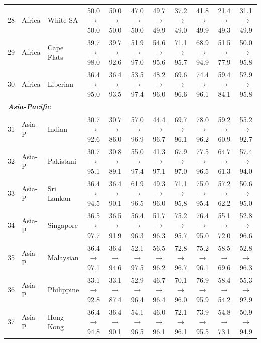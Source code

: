 \begin{table}[t]
{\begin{tabular}{rll c c c c c c c c}
28 & Africa & White SA & 50.0$\rightarrow$50.0 & 50.0$\rightarrow$50.0 & 47.0$\rightarrow$50.0 & 49.7$\rightarrow$49.9 & 37.2$\rightarrow$49.0 & 41.8$\rightarrow$49.9 & 21.4$\rightarrow$49.3 & 31.1$\rightarrow$49.9 \\
29 & Africa & Cape Flats & 39.7$\rightarrow$98.0 & 39.7$\rightarrow$92.6 & 51.9$\rightarrow$97.0 & 54.6$\rightarrow$95.6 & 71.1$\rightarrow$95.7 & 68.9$\rightarrow$94.9 & 51.5$\rightarrow$77.9 & 50.0$\rightarrow$95.8 \\
30 & Africa & Liberian & 36.4$\rightarrow$95.0 & 36.4$\rightarrow$93.5 & 53.5$\rightarrow$97.4 & 48.2$\rightarrow$96.0 & 69.6$\rightarrow$96.6 & 74.4$\rightarrow$96.1 & 59.4$\rightarrow$84.1 & 52.9$\rightarrow$95.8 \\
\midrule
\multicolumn{11}{l}{\textit{\textbf{Asia-Pacific}}} \\
31 & Asia-P & Indian & 30.7$\rightarrow$92.6 & 30.7$\rightarrow$86.0 & 57.0$\rightarrow$96.9 & 44.4$\rightarrow$96.7 & 69.7$\rightarrow$96.1 & 78.0$\rightarrow$96.2 & 59.2$\rightarrow$60.9 & 55.2$\rightarrow$92.7 \\
32 & Asia-P & Pakistani & 30.7$\rightarrow$95.1 & 30.8$\rightarrow$89.1 & 55.0$\rightarrow$97.4 & 41.3$\rightarrow$97.1 & 67.9$\rightarrow$97.0 & 77.5$\rightarrow$96.5 & 64.7$\rightarrow$61.3 & 57.4$\rightarrow$94.0 \\
33 & Asia-P & Sri Lankan & 36.4$\rightarrow$94.5 & 36.4$\rightarrow$90.1 & 61.9$\rightarrow$96.5 & 49.3$\rightarrow$96.0 & 71.1$\rightarrow$95.8 & 75.0$\rightarrow$95.4 & 57.2$\rightarrow$62.2 & 50.6$\rightarrow$95.0 \\
34 & Asia-P & Singapore & 36.5$\rightarrow$97.7 & 36.5$\rightarrow$91.9 & 56.4$\rightarrow$96.3 & 51.7$\rightarrow$96.3 & 75.2$\rightarrow$95.7 & 76.4$\rightarrow$95.0 & 55.1$\rightarrow$72.0 & 52.8$\rightarrow$96.6 \\
35 & Asia-P & Malaysian & 36.4$\rightarrow$97.1 & 36.4$\rightarrow$94.6 & 52.1$\rightarrow$97.5 & 56.5$\rightarrow$96.2 & 72.8$\rightarrow$96.7 & 75.2$\rightarrow$96.1 & 58.5$\rightarrow$69.6 & 52.8$\rightarrow$96.3 \\
36 & Asia-P & Philippine & 33.1$\rightarrow$92.8 & 33.1$\rightarrow$87.4 & 52.9$\rightarrow$96.4 & 46.7$\rightarrow$96.4 & 70.1$\rightarrow$96.0 & 76.9$\rightarrow$95.9 & 58.4$\rightarrow$54.2 & 55.3$\rightarrow$92.9 \\
37 & Asia-P & Hong Kong & 36.4$\rightarrow$94.8 & 36.4$\rightarrow$90.1 & 54.1$\rightarrow$96.5 & 46.0$\rightarrow$96.1 & 72.1$\rightarrow$96.1 & 73.9$\rightarrow$95.5 & 54.8$\rightarrow$73.1 & 50.9$\rightarrow$94.9 \\

\end{tabular}}
\end{table}
